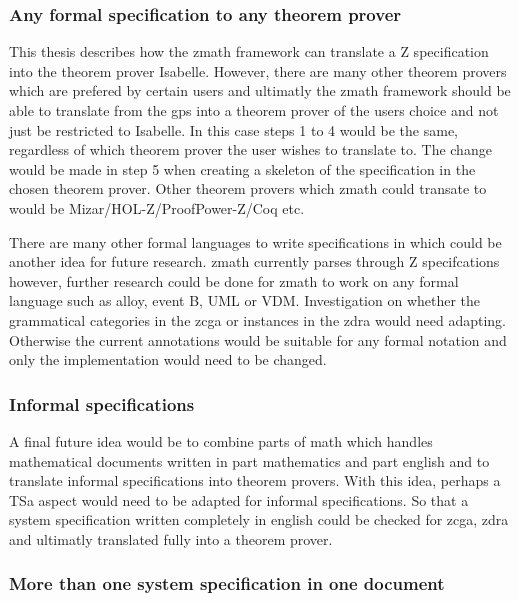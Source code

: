 \subsubsection{Any formal specification to any theorem prover}
\label{subsubsec:anyformanythe}

This thesis describes how the \gls{zmath} framework can translate a Z
specification into the theorem prover Isabelle. However, there are many other
theorem provers which are prefered by certain users and ultimatly the
\gls{zmath} framework should be able to translate from the \gls{gps} into a
theorem prover of the users choice and not just be restricted to Isabelle. In
this case steps 1 to 4 would be the same, regardless of which theorem prover the
user wishes to translate to. The change would be made in step 5 when creating a
skeleton of the specification in the chosen theorem prover. Other theorem
provers which \gls{zmath} could transate to would be
Mizar/HOL-Z/ProofPower-Z/Coq etc.

There are many other formal languages to write specifications in which could be
another idea for future research. \Gls{zmath} currently parses through Z
specifcations however, further research could be done for \gls{zmath} to work on
any formal language such as alloy, event B, UML or VDM. Investigation on whether
the grammatical categories in the \gls{zcga} or instances in the \gls{zdra}
would need adapting. Otherwise the current annotations would be suitable for any
formal notation and only the implementation would need to be changed.

\subsubsection{Informal specifications}
\label{subsubsec:informalspecs}

A final future idea would be to combine parts of \gls{math} which handles
mathematical documents written in part mathematics and part english and to
translate informal specifications into theorem provers. With this idea, perhaps
a TSa aspect would need to be adapted for informal specifications. So that a
system specification written completely in english could be checked for
\gls{zcga}, \gls{zdra} and ultimatly translated fully into a theorem prover.

\subsubsection{More than one system specification in one document}

